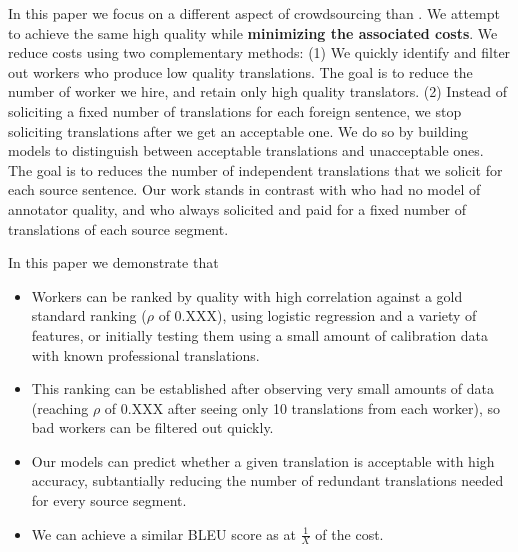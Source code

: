 \documentclass[11pt]{article}
\begin{document}
In this paper we focus on a different aspect of crowdsourcing than .  We attempt to achieve the same high quality while {\bf minimizing the associated costs}.  
We  reduce costs using two complementary methods: (1) We quickly identify and filter out workers who produce low quality translations.  The goal is to reduce the number of worker we hire, and retain only high quality translators. 
(2) Instead of soliciting a fixed number of translations for each foreign sentence, we stop soliciting translations after we get an acceptable one.  We do so by building models to distinguish between acceptable translations and unacceptable ones.  The goal is to reduces the number of independent translations that we solicit for each source sentence.
Our work stands in contrast with   who had no model of annotator quality, and who always solicited and paid for a fixed number of translations of each source segment. 
 
 In this paper we demonstrate that
 \begin{itemize}
 \item Workers can be ranked by quality with high correlation against a gold standard ranking ($\rho$ of 0.XXX), using logistic regression and a variety of features, or initially testing them using a small amount of calibration data with known professional translations.
 \item This ranking can be established after observing very small amounts of data (reaching $\rho$ of 0.XXX after seeing only 10 translations from each worker), so bad workers can be filtered out quickly.
 \item Our models can predict whether a given translation is acceptable with high accuracy, subtantially reducing the number of redundant translations needed for every source segment.
 \item We can achieve a similar BLEU score as  at $\frac{1}{X}$ of the cost.  
 \end{itemize} 
 
\end{document}
